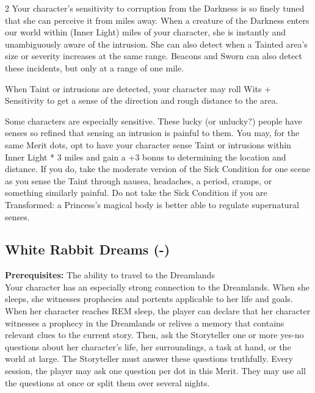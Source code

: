 \begin{multicols}{2}
\noindent Your character's sensitivity to corruption from the Darkness is so finely tuned that she can perceive it from miles away. When a creature of the Darkness enters our world within (Inner Light) miles of your character, she is instantly and unambiguously aware of the intrusion. She can also detect when a Tainted area's size or severity increases at the same range. Beacons and Sworn can also detect these incidents, but only at a range of one mile. 

When Taint or intrusions are detected, your character may roll Wits + Sensitivity to get a sense of the direction and rough distance to the area.

Some characters are especially sensitive. These lucky (or unlucky?) people have senses so refined that sensing an intrusion is painful to them. You may, for the same Merit dots, opt to have your character sense Taint or intrusions within Inner Light * 3 miles and gain a +3 bonus to determining the location and distance. If you do, take the moderate version of the Sick Condition for one scene as you sense the Taint through nausea, headaches, a period, cramps, or something similarly painful. Do not take the Sick Condition if you are Transformed: a Princess's magical body is better able to regulate supernatural senses.

\subsection*{White Rabbit Dreams (\textbullet\nobreak\hspace{.16667em}-\nobreak\hspace{.16667em}\textbullet\textbullet\textbullet\textbullet\textbullet)}

\textbf{Prerequisites:} The ability to travel to the Dreamlands\\

\noindent Your character has an especially strong connection to the Dreamlands. When she sleeps, she witnesses prophecies and portents applicable to her life and goals. When her character reaches REM sleep, the player can declare that her character witnesses a prophecy in the Dreamlands or relives a memory that contains relevant clues to the current story. Then, ask the Storyteller one or more yes-no questions about her character’s life, her surroundings, a task at hand, or the world at large. The Storyteller must answer these questions truthfully. Every session, the player may ask one question per dot in this Merit. They may use all the questions at once or split them over several nights.


\end{multicols}
